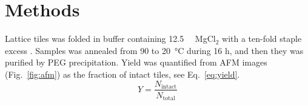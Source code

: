 \section{Methods}
Lattice tiles was folded in buffer containing \SI{12.5}{\milli\molar} MgCl$_2$ with a ten-fold staple excess \cite{alder2021,brook2022}. Samples was annealed from 90 to 20~\si{\celsius} during 16 h, and then they was purified by PEG precipitation.
Yield was quantified from AFM images (Fig.~\ref{fig:afm}) as the fraction of intact tiles, see Eq.~\eqref{eq:yield}.
\begin{equation}
  Y = \frac{N_\mathrm{intact}}{N_\mathrm{total}} \label{eq:yield}
\end{equation}
